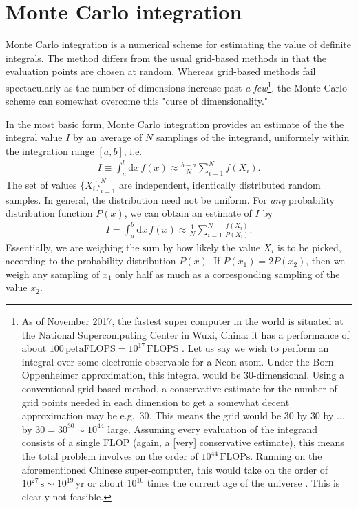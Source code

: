\documentclass[../../master.tex]{subfiles}
\begin{document}
\section{Monte Carlo integration}
Monte Carlo integration is a numerical scheme for estimating the value of definite integrals. The method differs from the usual grid-based methods in that the evaluation points are chosen at random. Whereas grid-based methods fail spectacularly as the number of dimensions increase past \emph{a few}\footnote{As of November 2017, the fastest super computer in the world is situated at the National Supercomputing Center in Wuxi, China: it has a performance of about $100 \,\text{petaFLOPS}=10^{17}\,\text{FLOPS}$ \cite{top500}. Let us say we wish to perform an integral over some electronic observable for a Neon atom. Under the Born-Oppenheimer approximation, this integral would be $30$-dimensional. Using a conventional grid-based method, a conservative estimate for the number of grid points needed in each dimension to get a somewhat decent approximation may be e.g.\ $30$. This means the grid would be $30$ by $30$ by $\dots$ by $30=30^{30}\sim 10^{44}$ large. Assuming every evaluation of the integrand consists of a single FLOP (again, a [very] conservative estimate), this means the total problem involves on the order of $10^{44}\,\text{FLOPs}$. Running on the aforementioned Chinese super-computer, this would take on the order of $10^{27}\,\text{s}\sim 10^{19}\,\text{yr}$ or about $10^{10}$ times the current age of the universe \cite{hjorth-jensen}. This is clearly not feasible.}, the Monte Carlo scheme can somewhat overcome this "curse of dimensionality." 

In the most basic form, Monte Carlo integration provides an estimate of the the integral value $I$ by an average of $N$ samplings of the integrand, uniformely within the integration range $[a,b]$, i.e.\
\begin{align}
I\equiv \int_a^b\mathrm{d}x\, f(x) \approx \frac{b-a}{N}\sum_{i=1}^N
 f(X_i). \label{eq:mci2}
\end{align}
The set of values $\{X_i\}_{i=1}^N$ are independent, identically distributed random samples. In general, the distribution need not be uniform. For \emph{any} probability distribution function $P(x)$, we can obtain an estimate of $I$ by
\begin{align}
I=\int_a^b\mathrm{d}x\, f(x) \approx \frac{1}{N}\sum_{i=1}^N \frac{f(X_i)}{P(X_i)}. \label{eq:mci1}
\end{align}
Essentially, we are weighing the sum by how likely the value $X_i$ is to be picked, according to the probability distribution $P(x)$. If $P(x_1)=2P(x_2)$, then we weigh any sampling of $x_1$ only half as much as a corresponding sampling of the value $x_2$. 
\end{document}
